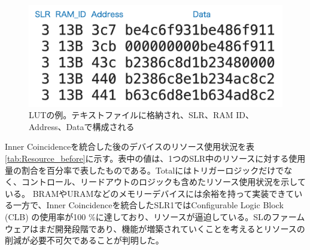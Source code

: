 \begin{figure} 
\centering
\includegraphics[width=16cm]{fig/SL/LUT_example.png}
\caption[LUTの例]{LUTの例。テキストファイルに格納され、SLR、RAM ID、Address、Dataで構成される}
\label{LUT_example}
\end{figure}

Inner Coincidenceを統合した後のデバイスのリソース使用状況を表\ref{tab:Resource_before}に示す。表中の値は、1つのSLR中のリソースに対する使用量の割合を百分率で表したものである。Totalにはトリガーロジックだけでなく、コントロール、リードアウトのロジックも含めたリソース使用状況を示している。
BRAMやURAMなどのメモリーデバイスには余裕を持って実装できている一方で、Inner Coincidenceを統合したSLR1ではConfigurable Logic Block (CLB) の使用率が100 \%に達しており、リソースが逼迫している。SLのファームウェアはまだ開発段階であり、機能が増築されていくことを考えるとリソースの削減が必要不可欠であることが判明した。
